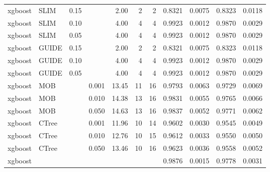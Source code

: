 \begin{table}[!htb]
\begin{tabular}[t]{l|l|r|r|r|r|r|r|r|r|r}
xgboost & SLIM & 0.15 & & 2.00 & 2 & 2 & 0.8321 & 0.0075 & 0.8323 & 0.0118\\
xgboost & SLIM & 0.10 & & 4.00 & 4 & 4 & 0.9923 & 0.0012 & 0.9870 & 0.0029\\
xgboost & SLIM & 0.05 & & 4.00 & 4 & 4 & 0.9923 & 0.0012 & 0.9870 & 0.0029\\
xgboost & GUIDE & 0.15 & & 2.00 & 2 & 2 & 0.8321 & 0.0075 & 0.8323 & 0.0118\\
xgboost & GUIDE & 0.10 & & 4.00 & 4 & 4 & 0.9923 & 0.0012 & 0.9870 & 0.0029\\
xgboost & GUIDE & 0.05 & & 4.00 & 4 & 4 & 0.9923 & 0.0012 & 0.9870 & 0.0029\\
xgboost & MOB & & 0.001 & 13.45 & 11 & 16 & 0.9793 & 0.0063 & 0.9729 & 0.0069\\
xgboost & MOB & & 0.010 & 14.38 & 13 & 16 & 0.9831 & 0.0055 & 0.9765 & 0.0066\\
xgboost & MOB & & 0.050 & 14.63 & 13 & 16 & 0.9837 & 0.0052 & 0.9771 & 0.0062\\
xgboost & CTree & & 0.001 & 11.96 & 10 & 14 & 0.9602 & 0.0030 & 0.9545 & 0.0049\\
xgboost & CTree & & 0.010 & 12.76 & 10 & 15 & 0.9612 & 0.0033 & 0.9550 & 0.0050\\
xgboost & CTree & & 0.050 & 13.46 & 10 & 16 & 0.9623 & 0.0036 & 0.9558 & 0.0052\\
\hline
xgboost & & & & & & & 0.9876 & 0.0015 & 0.9778 & 0.0031\\
\hline
\end{tabular}
\label{tab:app_linear_abrupt_1000}

\end{table}



